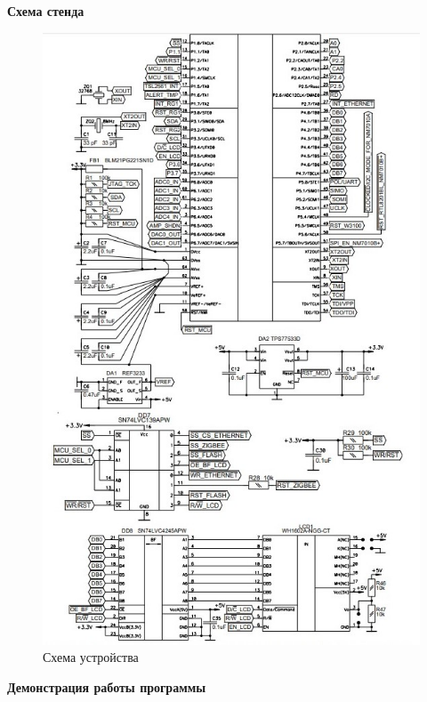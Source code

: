 \textbf{Схема стенда}

\begin{figure}
\centering
\includegraphics{./files/pic3.jpg}
\caption{Схема устройства}
\end{figure}

\textbf{Демонстрация работы программы}

